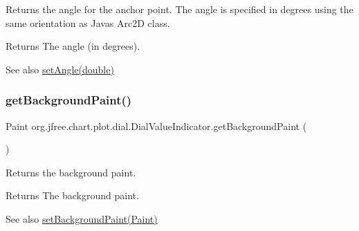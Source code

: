 Returns the angle for the anchor point. The angle is specified in degrees using the same orientation as Java\textquotesingle{}s {\ttfamily Arc2D} class.

\begin{DoxyReturn}{Returns}
The angle (in degrees).
\end{DoxyReturn}
\begin{DoxySeeAlso}{See also}
\mbox{\hyperlink{classorg_1_1jfree_1_1chart_1_1plot_1_1dial_1_1_dial_value_indicator_a14bf800c9619a29265c1523a5eed0e41}{set\+Angle(double)}} 
\end{DoxySeeAlso}
\mbox{\label{classorg_1_1jfree_1_1chart_1_1plot_1_1dial_1_1_dial_value_indicator_a23efc254350c58403200408b76bfa76b}} 
\subsubsection{\texorpdfstring{get\+Background\+Paint()}{getBackgroundPaint()}}
{\footnotesize\ttfamily Paint org.\+jfree.\+chart.\+plot.\+dial.\+Dial\+Value\+Indicator.\+get\+Background\+Paint (\begin{DoxyParamCaption}{ }\end{DoxyParamCaption})}

Returns the background paint.

\begin{DoxyReturn}{Returns}
The background paint.
\end{DoxyReturn}
\begin{DoxySeeAlso}{See also}
\mbox{\hyperlink{classorg_1_1jfree_1_1chart_1_1plot_1_1dial_1_1_dial_value_indicator_a4dae61c463927eda13f4c4ac7dbcc93d}{set\+Background\+Paint(\+Paint)}} 
\end{DoxySeeAlso}
\mbox{\label{classorg_1_1jfree_1_1chart_1_1plot_1_1dial_1_1_dial_value_indicator_adc50504d695c87e02091fa5e50fe5d5d}} 
